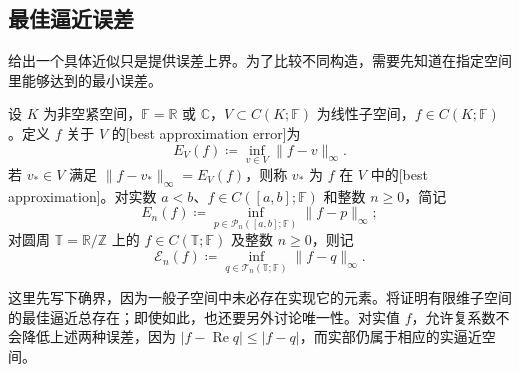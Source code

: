 \subsection{最佳逼近误差}
\label{b2:subsec:approximation-best-error}

给出一个具体近似只是提供误差上界。为了比较不同构造，需要先知道在指定空间里能够达到的最小误差。

\begin{definition}
\label{b2:def:approximation-best-error}
设 \(K\) 为非空紧空间，\(\mathbb F=\mathbb R\) 或 \(\mathbb C\)，\(V\subset C(K;\mathbb F)\) 为线性子空间，\(f\in C(K;\mathbb F)\)。定义 \(f\) 关于 \(V\) 的[best approximation error]为
\[
 E_V(f)\coloneqq\inf_{v\in V}\lVert f-v\rVert_\infty.
\]
若 \(v_*\in V\) 满足 \(\lVert f-v_*\rVert_\infty=E_V(f)\)，则称 \(v_*\) 为 \(f\) 在 \(V\) 中的[best approximation]。对实数 \(a<b\)、\(f\in C([a,b];\mathbb F)\) 和整数 \(n\geq0\)，简记
\[
 E_n(f)\coloneqq\inf_{p\in\mathcal P_n([a,b];\mathbb F)}
                    \lVert f-p\rVert_\infty;
\]
对圆周 \(\mathbb T=\mathbb R/\mathbb Z\) 上的 \(f\in C(\mathbb T;\mathbb F)\) 及整数 \(n\geq0\)，则记
\[
 \mathcal E_n(f)\coloneqq\inf_{q\in\mathcal T_n(\mathbb T;\mathbb F)}
                    \lVert f-q\rVert_\infty.
\]
\end{definition}

这里先写下确界，因为一般子空间中未必存在实现它的元素。将证明有限维子空间的最佳逼近总存在；即使如此，也还要另外讨论唯一性。对实值 \(f\)，允许复系数不会降低上述两种误差，因为 \(|f-\operatorname{Re}q|\leq|f-q|\)，而实部仍属于相应的实逼近空间。


